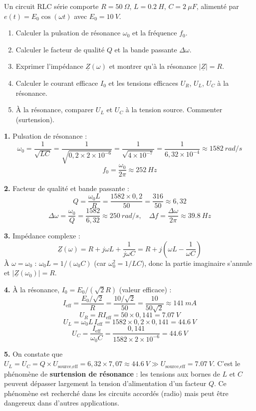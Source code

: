 \documentclass[12pt,a4paper]{article}
\begin{document}
\begin{boiteexercice}
Un circuit RLC série comporte $R=\qty{50}{\Omega}$, $L=\qty{0.2}{H}$, $C=\qty{2}{\mu F}$, alimenté par $e(t) = E_0\cos(\omega t)$ avec $E_0=\qty{10}{V}$.
\begin{enumerate}
  \item Calculer la pulsation de résonance $\omega_0$ et la fréquence $f_0$.
  \item Calculer le facteur de qualité $Q$ et la bande passante $\Delta\omega$.
  \item Exprimer l'impédance $\underline{Z}(\omega)$ et montrer qu'à la résonance $|\underline{Z}|=R$.
  \item Calculer le courant efficace $I_0$ et les tensions efficaces $U_R$, $U_L$, $U_C$ à la résonance.
  \item À la résonance, comparer $U_L$ et $U_C$ à la tension source. Commenter (surtension).
\end{enumerate}
\end{boiteexercice}

\begin{boitecorrige}
\textbf{1.} Pulsation de résonance :
\[
\omega_0 = \frac{1}{\sqrt{LC}} = \frac{1}{\sqrt{0{,}2\times2\times10^{-6}}} = \frac{1}{\sqrt{4\times10^{-7}}} = \frac{1}{6{,}32\times10^{-4}} \approx \qty{1582}{rad/s}
\]
\[
f_0 = \frac{\omega_0}{2\pi} \approx \qty{252}{Hz}
\]

\textbf{2.} Facteur de qualité et bande passante :
\[
Q = \frac{\omega_0 L}{R} = \frac{1582\times0{,}2}{50} = \frac{316}{50} \approx 6{,}32
\]
\[
\Delta\omega = \frac{\omega_0}{Q} = \frac{1582}{6{,}32} \approx \qty{250}{rad/s}, \quad \Delta f = \frac{\Delta\omega}{2\pi} \approx \qty{39.8}{Hz}
\]

\textbf{3.} Impédance complexe :
\[
\underline{Z}(\omega) = R + j\omega L + \frac{1}{j\omega C} = R + j\!\left(\omega L - \frac{1}{\omega C}\right)
\]
À $\omega=\omega_0$ : $\omega_0 L = 1/(\omega_0 C)$ (car $\omega_0^2=1/LC$), donc la partie imaginaire s'annule et $|\underline{Z}(\omega_0)| = R$.

\textbf{4.} À la résonance, $I_0 = E_0/(\sqrt{2}R)$ (valeur efficace) :
\[
I_{\text{eff}} = \frac{E_0/\sqrt{2}}{R} = \frac{10/\sqrt{2}}{50} = \frac{10}{50\sqrt{2}} \approx \qty{141}{mA}
\]
\[
U_R = RI_\text{eff} = 50\times0{,}141 = \qty{7.07}{V}
\]
\[
U_L = \omega_0 L\,I_\text{eff} = 1582\times0{,}2\times0{,}141 = \qty{44.6}{V}
\]
\[
U_C = \frac{I_\text{eff}}{\omega_0 C} = \frac{0{,}141}{1582\times2\times10^{-6}} = \qty{44.6}{V}
\]

\textbf{5.} On constate que $U_L = U_C = Q\times U_\text{source,eff} = 6{,}32\times7{,}07 \approx \qty{44.6}{V} \gg U_\text{source,eff} = \qty{7.07}{V}$.
C'est le phénomène de \textbf{surtension de résonance} : les tensions aux bornes de $L$ et $C$ peuvent dépasser largement la tension d'alimentation d'un facteur $Q$. Ce phénomène est recherché dans les circuits accordés (radio) mais peut être dangereux dans d'autres applications.
\end{boitecorrige}
\end{document}
